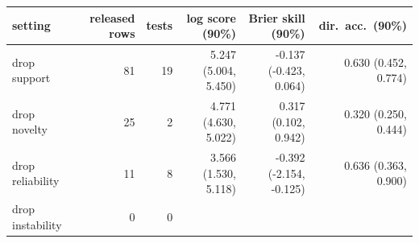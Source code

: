 \begin{tabular}{lrrrrr}
\toprule
setting & released rows & tests & log score (90\%) & Brier skill (90\%) & dir.\ acc.\ (90\%) \\
\midrule
drop support & 81 & 19 & 5.247 (5.004, 5.450) & -0.137 (-0.423, 0.064) & 0.630 (0.452, 0.774) \\
drop novelty & 25 & 2 & 4.771 (4.630, 5.022) & 0.317 (0.102, 0.942) & 0.320 (0.250, 0.444) \\
drop reliability & 11 & 8 & 3.566 (1.530, 5.118) & -0.392 (-2.154, -0.125) & 0.636 (0.363, 0.900) \\
drop instability & 0 & 0 &  &  &  \\
\bottomrule
\end{tabular}
